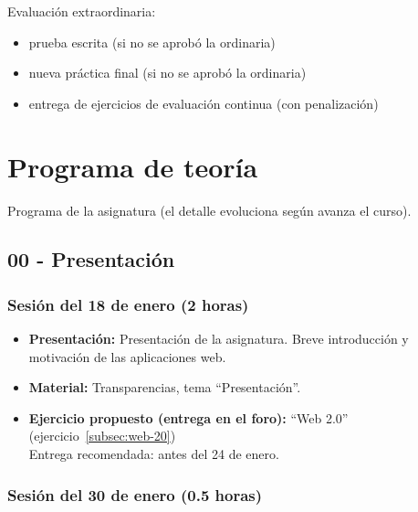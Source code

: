 \documentclass[a4paper,12pt]{article}
\begin{document}
Evaluación extraordinaria:

\begin{itemize}
\item prueba escrita (si no se aprobó la ordinaria)
\item nueva práctica final (si no se aprobó la ordinaria)
\item entrega de ejercicios de evaluación continua (con penalización)
\end{itemize}

\newpage

\section{Programa de teoría}

Programa de la asignatura (el detalle evoluciona según avanza el curso).

\subsection{00 - Presentación}

\subsubsection{Sesión del 18 de enero (2 horas)}

\begin{itemize}
\item \textbf{Presentación:} Presentación de la asignatura. Breve introducción y motivación de las aplicaciones web.
\item \textbf{Material:} Transparencias, tema ``Presentación''.
\item \textbf{Ejercicio propuesto (entrega en el foro):} ``Web 2.0'' (ejercicio~\ref{subsec:web-20}) \\
  Entrega recomendada: antes del 24 de enero.
\end{itemize}

\subsubsection{Sesión del 30 de enero (0.5 horas)}
\end{document}
